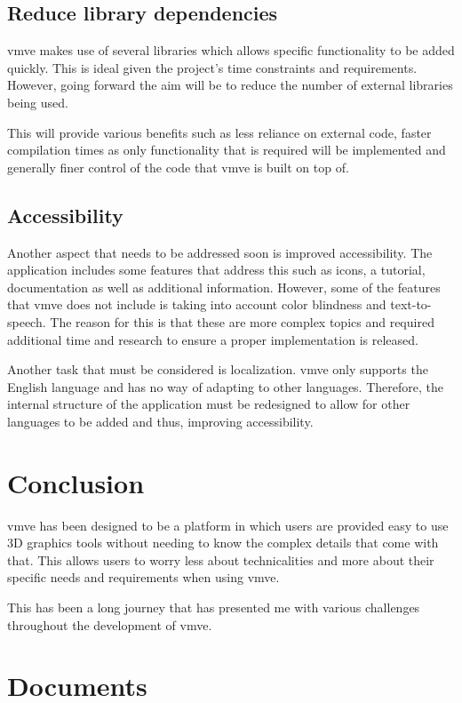 \documentclass[11pt]{article}
\begin{document}
\subsection{Reduce library dependencies}
\gls*{vmve} makes use of several libraries which allows specific functionality to
be added quickly. This is ideal given the project's time constraints and
requirements. However, going forward the aim will be to reduce the number of
external libraries being used.

This will provide various benefits such as less reliance on external code,
faster compilation times as only functionality that is required will be
implemented and generally finer control of the code that \gls*{vmve} is built on
top of.

\subsection{Accessibility}
Another aspect that needs to be addressed soon is improved accessibility. The
application includes some features that address this such as icons, a tutorial,
documentation as well as additional information. However, some of the features
that \gls*{vmve} does not include is taking into account color blindness and
text-to-speech. The reason for this is that these are more complex topics and
required additional time and research to ensure a proper implementation is
released.

Another task that must be considered is localization. \gls*{vmve} only supports
the English language and has no way of adapting to other languages. Therefore,
the internal structure of the application must be redesigned to allow for
other languages to be added and thus, improving accessibility.

\clearpage
\section{Conclusion}

\gls*{vmve} has been designed to be a platform in which users are provided easy to use
3D graphics tools without needing to know the complex details that come with
that. This allows users to worry less about technicalities and more about their
specific needs and requirements when using \gls*{vmve}.

This has been a long journey that has presented me with various challenges
throughout the development of \gls*{vmve}.


\clearpage
\section{Documents}
\end{document}

